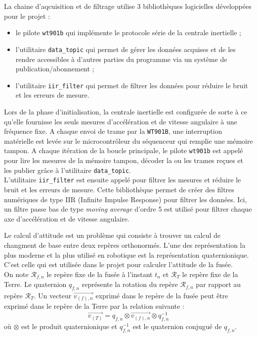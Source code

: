 La chaine d'aqcuisition et de filtrage utilise 3 bibliothèques logicielles développées pour le projet :
\begin{itemize}
	\item le pilote \texttt{wt901b} qui implémente le protocole série de la centrale inertielle ;
	\item l'utilitaire \texttt{data\_topic} qui permet de gérer les données acquises et de les rendre accessibles à d'autres
	parties du 	programme via un système de publication/abonnement ;
	\item l'utilitaire \texttt{iir\_filter} qui permet de filtrer les données pour réduire le bruit et les erreurs de mesure.\\
\end{itemize}

Lors de la phase d'initialisation, la centrale inertielle est configurée de sorte à ce qu'elle fournisse les seuls mesures
d'accélération et de vitesse angulaire à une fréquence fixe. A chaque envoi de trame par la \texttt{WT901B}, une interruption
matérielle est levée sur le microcontrôleur du séquenceur qui remplie une mémoire tampon. A chaque itération de la boucle
principale, le pilote \texttt{wt901b} est appelé pour lire les mesures de la mémoire tampon, décoder la ou les trames reçues et
les publier grâce à l'utilitaire \texttt{data\_topic}.\\

L'utilitaire \texttt{iir\_filter} est ensuite appelé pour filtrer les mesures et réduire le bruit et les erreurs de mesure. Cette
bibliothèque permet de créer des filtres numériques de type IIR (Infinite Impulse Response) pour filtrer les données. Ici,
un filtre passe bas de type \textit{moving average} d'ordre 5 est utilisé pour filtrer chaque axe d'accélération et de vitesse
angulaire.

\newpage


Le calcul d'attitude est un problème qui consiste à trouver un calcul de changment de base entre deux repères orthonormés. L'une
des représentation la plus moderne et la plus utilisé en robotique est la représentation quaternionique. C'est celle qui est
utilisée dans le projet pour calculer l'attitude de la fusée.\\

On note $\mathcal{R}_{f,n}$ le repère fixe de la fusée à l'instant $t_n$ et $\mathcal{R}_T$ le repère fixe de la Terre.
Le quaternion $q_{f,n}$ représente la rotation du repère $\mathcal{R}_{f,n}$ par rapport au repère $\mathcal{R}_T$. Un vecteur
$\overrightarrow{v_{(f),n}}$ exprimé dans le repère de la fusée peut être exprimé dans le repère de la Terre par la relation
suivante :
\begin{equation}
	\overrightarrow{v_{(T)}} = q_{f,n} \otimes \overrightarrow{v_{(f),n}} \otimes q_{f,n}^{-1}
	\label{eq:quat_rotation}
\end{equation}
où $\otimes$ est le produit quaternionique et $q_{f,n}^{-1}$ est le quaternion conjugué de $q_{f,n}$.\\

